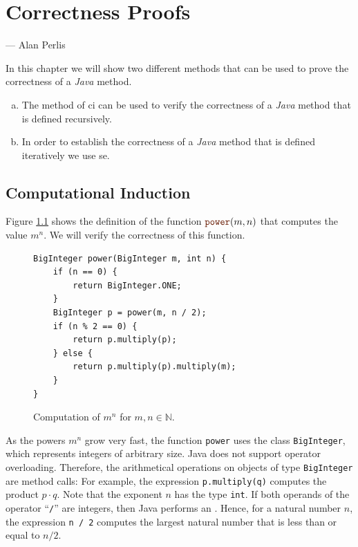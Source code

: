 \chapter{Correctness Proofs}
\epigraph{}{
    --- \calligfont Alan Perlis}

\noindent
In this chapter we will show two different methods that can be used to prove the correctness of a \textsl{Java}
method.
\begin{enumerate}[(a)]
\item The method of \gls{ci} can be used to verify the correctness of a \textsl{Java}
      method that is defined recursively.
\item In order to establish the correctness of a \textsl{Java} method that is defined iteratively we use
      \gls{se}. 
\end{enumerate}

\section{Computational Induction}
Figure \ref{fig:power.py} shows the definition of the function $\mytt{power}(m,n)$ that computes
the value $m^n$.  We will verify the correctness of this function.

\begin{figure}[!h]
  \centering
\begin{verbatim}
BigInteger power(BigInteger m, int n) {
    if (n == 0) {
        return BigInteger.ONE;
    }
    BigInteger p = power(m, n / 2);
    if (n % 2 == 0) {
        return p.multiply(p);
    } else {
        return p.multiply(p).multiply(m);
    }
}
\end{verbatim}
\vspace*{-0.3cm}
  \caption{Computation of $m^n$ for $m,n \in \mathbb{N}$.}
  \label{fig:power.py}
\end{figure} 

As the powers $m^n$ grow very fast, the function \texttt{power} uses the class \texttt{BigInteger},
which represents integers of arbitrary size.  Java does not support operator overloading.  Therefore, the
arithmetical operations on objects of type \texttt{BigInteger} are method calls:  For example, the expression
\texttt{p.multiply(q)} computes the product $p \cdot q$.  Note that the exponent $n$ has the type \texttt{int}.
If both operands of the operator ``\texttt{/}'' are integers, then Java performs an .
Hence, for a natural number $n$, the expression \texttt{n / 2} computes the largest natural number that is
less than or equal to $n/2$.

